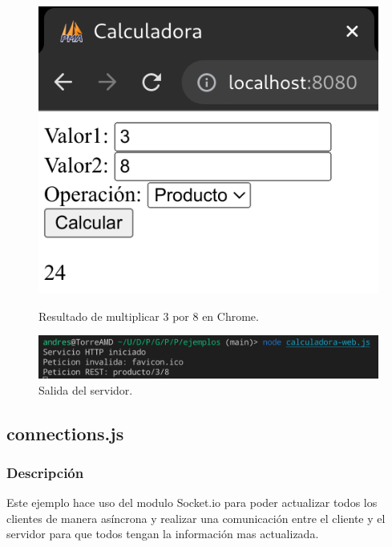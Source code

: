 \documentclass{article}
\begin{document}
\begin{figure}[H]
    \centering
    \begin{minipage}[H]{0.49\textwidth}
        \centering
        \includegraphics[width=\textwidth]{images/cwebprod.png}
        \caption{Resultado de multiplicar 3 por 8 en Chrome.}
    \end{minipage}
    \hfill
    \begin{minipage}[H]{0.49\textwidth}
        \centering
        \includegraphics[width=\textwidth]{images/cwebprodserver.png}
        \caption{Salida del servidor.}
    \end{minipage}
\end{figure}

\subsection{connections.js}
\subsubsection{Descripción}
Este ejemplo hace uso del modulo Socket.io para poder actualizar todos los clientes de manera asíncrona y realizar una comunicación entre el cliente y el servidor para que todos tengan la información mas actualizada.
\end{document}

